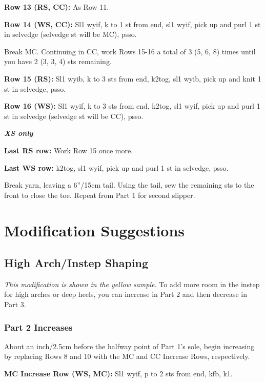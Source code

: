 \documentclass[12pt]{article}
\newcommand{\vocab}[1]{\emph{\textbf{#1}}} %
\newcommand{\rowDir}[1]{\textbf{#1:}} %
\newenvironment{frdirection}
    {%
	\def\FrameCommand{\fboxrule=\FrameRule\fboxsep=\FrameSep \fbox}
   	\MakeFramed {\advance\hsize-\width \FrameRestore}
    	\addmargin[2em]{0pt}}
    {\endaddmargin
	\endMakeFramed}
\begin{document}
\rowDir{Row 13 (RS, CC)} As Row 11.

\rowDir{Row 14 (WS, CC)} Sl1 wyif, k to 1 st from end, sl1 wyif, pick up and purl 1 st in selvedge (selvedge st will be MC), psso.

\vfill
\newpage
Break MC. Continuing in CC, work Rows 15-16 a total of 3 (5, 6, 8) times until you have 2 (3, 3, 4) sts remaining.

\rowDir{Row 15 (RS)} Sl1 wyib, k to 3 sts from end, k2tog, sl1 wyib, pick up and knit 1 st in selvedge, psso.

\rowDir{Row 16 (WS)} Sl1 wyif, k to 3 sts from end, k2tog, sl1 wyif, pick up and purl 1 st in selvedge (selvedge st will be CC), psso.

\begin{frdirection}
\hspace{-2em}\vocab{XS only}

\rowDir{Last RS row} Work Row 15 once more. 

\rowDir{Last WS row} k2tog, sl1 wyif, pick up and purl 1 st in selvedge, psso.
\end{frdirection}

Break yarn, leaving a 6”/15cm tail. Using the tail, sew the remaining sts to the front to close the toe. Repeat from Part 1 for second slipper.

\section*{Modification Suggestions}

\subsection*{High Arch/Instep Shaping}

\emph{This modification is shown in the yellow sample.} To add more room in the instep for high arches or deep heels, you can increase in Part 2 and then decrease in Part 3.

\subsubsection*{Part 2 Increases}

About an inch/2.5cm before the halfway point of Part 1's sole, begin increasing by replacing Rows 8 and 10 with the MC and CC Increase Rows, respectively. 

\rowDir{MC Increase Row (WS, MC)} Sl1 wyif, p to 2 sts from end, kfb, k1.
\end{document}
